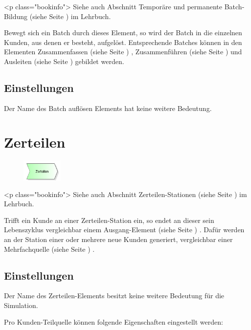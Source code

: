 <p class="bookinfo">
Siehe auch Abschnitt Temporäre und permanente Batch-Bildung (siehe Seite \pageref{ref:book:8.2.5}) im Lehrbuch.

Bewegt sich ein Batch durch dieses Element, so wird der Batch in die einzelnen Kunden, aus denen er
besteht, aufgelöst. Entsprechende Batches können in den Elementen Zusammenfassen (siehe Seite \pageref{ref:ModelElementBatch}) ,
Zusammenführen (siehe Seite \pageref{ref:ModelElementMatch}) und Ausleiten (siehe Seite \pageref{ref:ModelElementPickUp}) 
gebildet werden.

\subsection*{Einstellungen}

Der Name des Batch auflösen Elements hat keine weitere Bedeutung.


\section{Zerteilen}
\label{ref:ModelElementSplit}

\begin{figure}
\vspace{-22pt}
\includegraphics[width=2cm]{imageModelElementSplit.png}
\vspace{-22pt}
\end{figure}

<p class="bookinfo">
Siehe auch Abschnitt Zerteilen-Stationen (siehe Seite \pageref{ref:book:8.2.7}) im Lehrbuch.

Trifft ein Kunde an einer Zerteilen-Station ein, so endet an dieser sein
Lebenszyklus vergleichbar einem Ausgang-Element (siehe Seite \pageref{ref:ModelElementDispose}) .
Dafür werden an der Station einer oder mehrere neue Kunden generiert, vergleichbar
einer Mehrfachquelle (siehe Seite \pageref{ref:ModelElementSourceMulti}) .

\subsection*{Einstellungen}

Der Name des Zerteilen-Elements besitzt keine weitere Bedeutung für die Simulation.

Pro Kunden-Teilquelle können folgende Eigenschaften eingestellt werden: 

